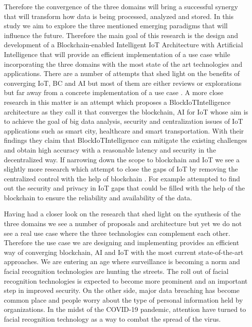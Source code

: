 Therefore the convergence of the three domains will bring a successful synergy that will transform how data is being processed, analyzed and stored. In this study we aim to explore the three mentioned emerging paradigms that will influence the future. Therefore the main goal of this research is the design and development of a Blockchain-enabled Intelligent IoT Architecture with Artificial Intelligence that will provide an efficient implementation of a use case while incorporating the three domains with the most state of the art technologies and applications. 
There are a number of attempts that shed light on the benefits of converging IoT, BC and AI \cite{bdcc4040028} but most of them are either reviews or explorations but far away from a concrete implementation of a use case \cite{Parker_Bach_2020}. A more close research in this matter is an attempt \cite{blockiotintelligent} which proposes a BlockIoTIntelligence architecture as they call it that converges the blockchain, AI for IoT whose aim is to achieve the goal of big data analysis, security and centralization issues of IoT applications such as smart city, healthcare and smart transportation. With their findings they claim that BlockIoTIntelligence can mitigate the existing challenges and obtain high accuracy with a reasonable latency and security in the decentralized way. 
If narrowing down the scope to blockchain and IoT we see a slightly more research which attempt to close the gaps of IoT by removing the centralized control with the help of blockchain \cite{9314805}.
For example \cite{10.1145/3417987} attempted to find out the security and privacy in IoT  gaps that could be filled with the help of the blockchain to ensure the reliability and availability of the data. 

Having had a closer look on the research that shed light on the synthesis of the three domains we see a number of proposals and architecture but yet we do not see a real use case where the three technologies can complement each other. Therefore the use case we are designing and implementing provides an efficient way of converging blockchain, AI and IoT with the most current state-of-the-art approaches. 
We are entering an age where surveillance is becoming a norm and facial recognition technologies are hunting the streets. The roll out of facial recognition technologies is expected to become more prominent and an important step in improved security. On the other side, major data breaching has become common place and people worry about the type of personal information held by organizations. In the midst of the COVID-19 pandemic, attention have turned to facial recognition technology as a way to combat the spread of the virus.

